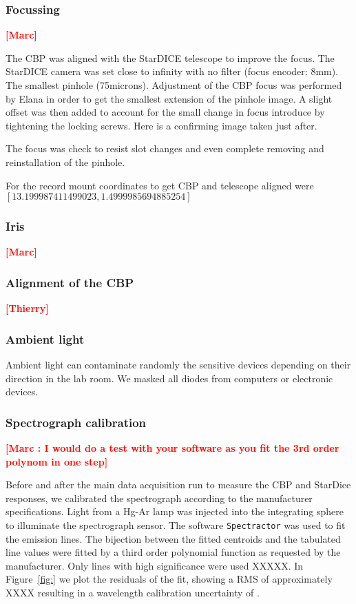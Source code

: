 \documentclass[onecolumn]{aa}
\newcommand{\SD}{StarDice }
\newcommand{\todo}[1]{\textbf{\textcolor{red}{[#1]}}\xspace}
\begin{document}
\subsubsection{Focussing}

\todo{Marc}


The CBP was aligned with the StarDICE telescope to improve the focus. The
StarDICE camera was set close to infinity with no filter (focus encoder:
8mm). The smallest pinhole (75microns). Adjustment of the CBP focus was
performed by Elana in order to get the smallest extension of the pinhole
image. A slight offset was then added to account for the small change in focus
introduce by tightening the locking screws. Here is a confirming image taken
just after.

The focus was check to resist slot changes and even complete removing and
reinstallation of the pinhole.

For the record mount coordinates to get CBP and telescope aligned were
$[13.199987411499023, 1.4999985694885254]$


\subsubsection{Iris}

\todo{Marc}


\subsubsection{Alignment of the CBP}

\todo{Thierry}


\subsubsection{Ambient light}

Ambient light can contaminate randomly the sensitive devices depending on their direction in the lab room. We masked all diodes from computers or electronic devices.

\subsubsection{Spectrograph calibration}

\todo{Marc : I would do a test with your software as you fit the 3rd order polynom in one step}

Before and after the main data acquisition run to measure the CBP and \SD responses, we calibrated the spectrograph according to the manufacturer specifications. Light from a Hg-Ar lamp was injected into the integrating sphere to illuminate the spectrograph sensor. The software \texttt{Spectractor} was used to fit the emission lines. The bijection between the fitted centroids and the tabulated line values were fitted by a third order polynomial function as requested by the manufacturer. Only lines with high significance were used XXXXX. In Figure~\ref{fig:} we plot the residuals of the fit, showing a RMS of approximately XXXX resulting in a wavelength calibration uncertainty of .
\end{document}
